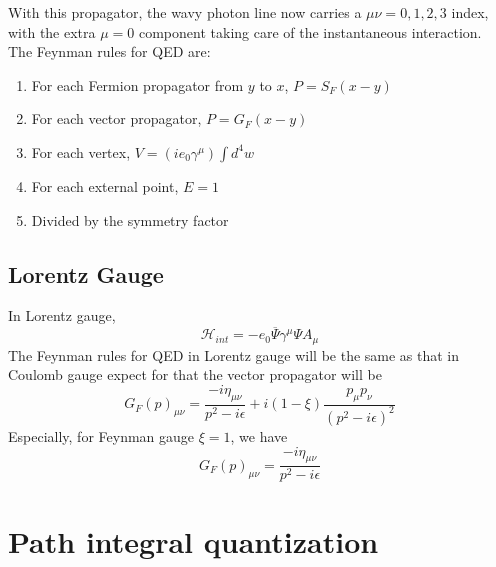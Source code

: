 With this propagator, the wavy photon line now carries a $\mu \nu = 0,1,2,3$ index, with the extra $\mu=0$ component taking care of the instantaneous interaction.\\
The Feynman rules for QED are:
\begin{enumerate}
\item For each Fermion propagator from $y$ to $x$, $P = S_F(x-y)$
\item For each vector propagator, $P = G_F(x-y)$
\item For each vertex, $V = (ie_0\gamma^{\mu})\int d^4w$
\item For each external point, $E=1$
\item Divided by the symmetry factor
\end{enumerate}

\subsection{Lorentz Gauge}
\noindent
In Lorentz gauge,
\[\mathcal{H}_{int} = -e_0 \overline{\Psi} \gamma^{\mu} \Psi A_{\mu}\]
The Feynman rules for QED in Lorentz gauge will be the same as that in Coulomb gauge expect for that the vector propagator will be
\[G_F(p)_{\mu\nu}  = \frac{-i\eta_{\mu\nu}}{p^2-i\epsilon} + i(1-\xi)\frac{p_{\mu}p_{\nu}}{(p^2-i\epsilon)^2} \]
Especially, for Feynman gauge $\xi=1$, we have
\[G_F(p)_{\mu\nu}  = \frac{-i\eta_{\mu\nu}}{p^2-i\epsilon} \]

\section{Path integral quantization}
